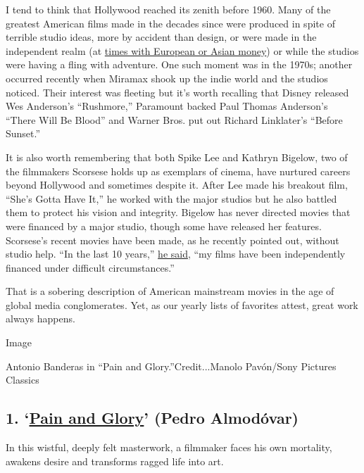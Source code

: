 I tend to think that Hollywood reached its zenith before 1960. Many of
the greatest American films made in the decades since were produced in
spite of terrible studio ideas, more by accident than design, or were
made in the independent realm (at
\href{https://filmmakermagazine.com/107829-end-of-the-road-jim-jarmusch-on-his-johnny-depp-starring-western-death-trip-dead-man/}{times
with European or Asian money}) or while the studios were having a fling
with adventure. One such moment was in the 1970s; another occurred
recently when Miramax shook up the indie world and the studios noticed.
Their interest was fleeting but it's worth recalling that Disney
released Wes Anderson's ``Rushmore,'' Paramount backed Paul Thomas
Anderson's ``There Will Be Blood'' and Warner Bros. put out Richard
Linklater's ``Before Sunset.''

It is also worth remembering that both Spike Lee and Kathryn Bigelow,
two of the filmmakers Scorsese holds up as exemplars of cinema, have
nurtured careers beyond Hollywood and sometimes despite it. After Lee
made his breakout film, ``She's Gotta Have It,'' he worked with the
major studios but he also battled them to protect his vision and
integrity. Bigelow has never directed movies that were financed by a
major studio, though some have released her features. Scorsese's recent
movies have been made, as he recently pointed out, without studio help.
``In the last 10 years,''
\href{https://deadline.com/2019/10/martin-scorsese-netflix-irishman-women-characters-marvel-movies-theme-park-rome-festival-1202765130/}{he
said}, ``my films have been independently financed under difficult
circumstances.''

That is a sobering description of American mainstream movies in the age
of global media conglomerates. Yet, as our yearly lists of favorites
attest, great work always happens.

Image

Antonio Banderas in ``Pain and Glory.''Credit...Manolo Pavón/Sony
Pictures Classics

\hypertarget{1-pain-and-glory-pedro-almoduxf3var}{%
\subsection{\texorpdfstring{1.
`\href{https://www.nytimes.com/2019/10/03/movies/pain-and-glory-review.html}{Pain
and Glory}' (Pedro
Almodóvar)}{1. `Pain and Glory' (Pedro Almodóvar)}}\label{1-pain-and-glory-pedro-almoduxf3var}}

In this wistful, deeply felt masterwork, a filmmaker faces his own
mortality, awakens desire and transforms ragged life into art.

